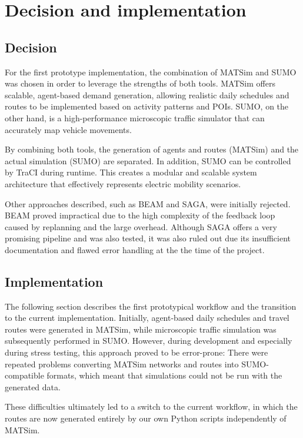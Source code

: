 \section{Decision and implementation}

\subsection{Decision}
For the first prototype implementation, the combination of MATSim and SUMO was chosen in order to leverage the strengths of both tools. MATSim offers scalable, agent-based demand generation, allowing realistic daily schedules and routes to be implemented based on activity patterns and POIs. SUMO, on the other hand, is a high-performance microscopic traffic simulator that can accurately map vehicle movements.

By combining both tools, the generation of agents and routes (MATSim) and the actual simulation (SUMO) are separated. In addition, SUMO can be controlled by TraCI during runtime. This creates a modular and scalable system architecture that effectively represents electric mobility scenarios.

Other approaches described, such as BEAM and SAGA, were initially rejected. BEAM proved impractical due to the high complexity of the feedback loop caused by replanning and the large overhead. Although SAGA offers a very promising pipeline and was also tested, it was also ruled out due its insufficient documentation and flawed error handling at the the time of the project.

\subsection{Implementation}
The following section describes the first prototypical workflow and the transition to the current implementation. Initially, agent-based daily schedules and travel routes were generated in MATSim, while microscopic traffic simulation was subsequently performed in SUMO.
However, during development and especially during stress testing, this approach proved to be error-prone: There were repeated problems converting MATSim networks and routes into SUMO-compatible formats, which meant that simulations could not be run with the generated data.

These difficulties ultimately led to a switch to the current workflow, in which the routes are now generated entirely by our own Python scripts independently of MATSim.

